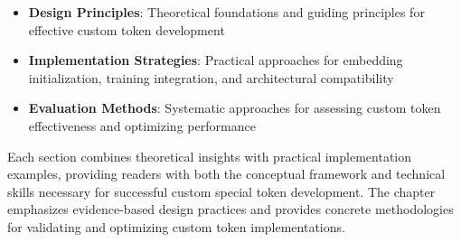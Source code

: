 \begin{itemize}
\item \textbf{Design Principles}: Theoretical foundations and guiding principles for effective custom token development
\item \textbf{Implementation Strategies}: Practical approaches for embedding initialization, training integration, and architectural compatibility
\item \textbf{Evaluation Methods}: Systematic approaches for assessing custom token effectiveness and optimizing performance
\end{itemize}

Each section combines theoretical insights with practical implementation examples, providing readers with both the conceptual framework and technical skills necessary for successful custom special token development. The chapter emphasizes evidence-based design practices and provides concrete methodologies for validating and optimizing custom token implementations.